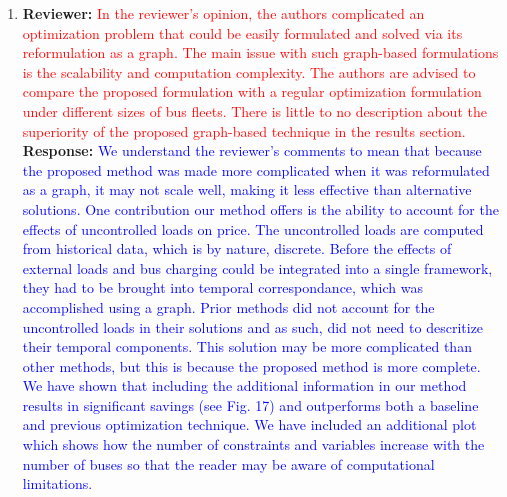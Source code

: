 \documentclass{article}
\newcommand\formatfeedback[2]
{%
	\textbf{Reviewer:} \textcolor{red}{#1} 
	\leavevmode\\[0.1in] \textbf{Response:} \textcolor{blue}{#2}
}
\begin{document}
\begin{enumerate}
	\item \formatfeedback{In the reviewer's opinion, the authors complicated an optimization problem that could be easily formulated and solved via its reformulation as a graph. The main issue with such graph-based formulations is the scalability and computation complexity. The authors are advised to compare the proposed formulation with a regular optimization formulation under different sizes of bus fleets. There is little to no description about the superiority of the proposed graph-based technique in the results section.}{We understand the reviewer's comments to mean that because the proposed method was made more complicated when it was reformulated as a graph, it may not scale well, making it less effective than alternative solutions. One contribution our method offers is the ability to account for the effects of uncontrolled loads on price. The uncontrolled loads are computed from historical data, which is by nature, discrete. Before the effects of external loads and bus charging could be integrated into a single framework, they had to be brought into temporal correspondance, which was accomplished using a graph. Prior methods did not account for the uncontrolled loads in their solutions and as such, did not need to descritize their temporal components. This solution may be more complicated than other methods, but this is because the proposed method is more complete. We have shown that including the additional information in our method results in significant savings (see Fig. 17) and outperforms both a baseline and previous optimization technique. We have included an additional plot which shows how the number of constraints and variables increase with the number of buses so that the reader may be aware of computational limitations. 
 }
\end{enumerate}
\end{document}
